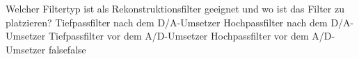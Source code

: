     {Welcher Filtertyp ist als Rekonstruktionsfilter geeignet und wo ist das Filter zu platzieren?}
    {Tiefpassfilter nach dem D/A-Umsetzer}
    {Hochpassfilter nach dem D/A-Umsetzer}
    {Tiefpassfilter vor dem A/D-Umsetzer}
    {Hochpassfilter vor dem A/D-Umsetzer}
    {false}{false}